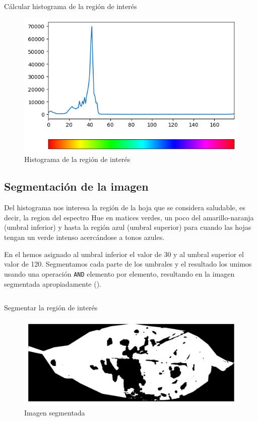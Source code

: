 \begin{listing}[!ht]
\inputminted{python}{code_listings/histogram.py}
\caption{Cálcular histograma de la región de interés}
\label{code:histogram}
\end{listing}

\begin{figure}[!ht]
\centering
\includegraphics[width=\textwidth]{images/histogram.png}
\caption{Histograma de la región de interés}
\label{img:histogram}
\end{figure}

\subsection{Segmentación de la imagen}
\label{sec:segmentation}
Del histograma nos interesa la región de la hoja que se considera saludable, es decir, la region del espectro Hue en matices verdes, un poco del amarillo-naranja (umbral inferior) y hasta la región azul (umbral superior) para cuando las hojas tengan un verde intenso acercándose a tonos azules.

En el  hemos asignado al umbral inferior el valor de 30 y al umbral superior el valor de 120. Segmentamos cada parte de los umbrales y el resultado los unimos usando una operación \texttt{AND} elemento por elemento, resultando en la imagen segmentada apropiadamente ().

\begin{listing}[!ht]
\inputminted{python}{code_listings/segmentation.py}
\caption{Segmentar la región de interés}
\label{code:segmentation}
\end{listing}

\begin{figure}[!ht]
\centering
\includegraphics[scale=1]{images/segmentation.png}
\caption{Imagen segmentada}
\label{img:segmentation}
\end{figure}

